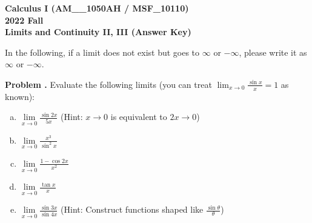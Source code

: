 \documentclass[11pt,letterpaper]{article}
\newcounter{problem}
\newcommand{\problem}{
	\stepcounter{problem}%
	\noindent \textbf{Problem \theproblem. }%
}
\begin{document}
\noindent\textbf{\large Calculus I (AM\_\_1050AH / MSF\_10110) \\ 2022 Fall \\ Limits and Continuity II, III (Answer Key)}

\bigskip

In the following, if a limit does not exist but goes to $\infty$ or $-\infty$, please write it as $\infty$ or $-\infty$.

\bigskip


\problem Evaluate the following limits (you can treat $\lim_{x\rightarrow0} \frac{\sin x}{x} = 1$ as known):
\begin{enumerate}[(a)]
    \item $\lim\limits_{x \to 0} \frac{\sin 2x}{5x}$ \quad (Hint: $x \rightarrow 0$ is equivalent to $2x \rightarrow 0$)
    \item $\lim\limits_{x \to 0} \frac{x^3}{\sin^2 x}$
    \item $\lim\limits_{x \to 0} \frac{1- \cos 2x}{x^2}$
    \item $\lim\limits_{x \to 0} \frac{\tan x}{x}$
    \item $\lim\limits_{x \to 0} \frac{\sin 3x}{\sin 4x}$ \quad (Hint: Construct functions shaped like $\frac{\sin\theta}{\theta}$)
\end{enumerate}\vspace{6mm}
\end{document}
